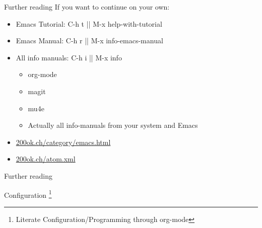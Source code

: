 \documentclass[bigger]{beamer}
\begin{document}
\begin{frame}[fragile,label={sec:orgfba8a7d}]{Further reading}
 If you want to continue on your own:

\begin{itemize}
\item Emacs Tutorial: C-h t || M-x help-with-tutorial
\item Emacs Manual: C-h r || M-x info-emacs-manual
\item All info manuals: C-h i || M-x info
\begin{itemize}
\item org-mode
\item magit
\item mu4e
\item Actually all info-manuals from your system and Emacs
\end{itemize}

\item \href{https://200ok.ch/category/emacs.html}{200ok.ch/category/emacs.html}
\item \href{https://200ok.ch/atom.xml}{200ok.ch/atom.xml}
\end{itemize}
\end{frame}

\begin{frame}[label={sec:org58b5be0}]{Further reading}
\begin{block}{Configuration}
 \footnote{Literate Configuration/Programming through org-mode}
\end{block}
\end{frame}
\end{document}
